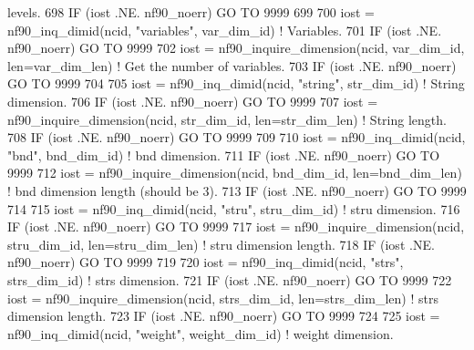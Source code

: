 \begin{DoxyCode}
{       levels.}
698     \textcolor{keywordflow}{IF} (iost .NE. nf90\_noerr) \textcolor{keywordflow}{GO TO} 9999
699 
700     iost    = nf90\_inq\_dimid(ncid, \textcolor{stringliteral}{"variables"}, var\_dim\_id)                     \textcolor{comment}{! Variables.}
701     \textcolor{keywordflow}{IF} (iost .NE. nf90\_noerr) \textcolor{keywordflow}{GO TO} 9999
702     iost    = nf90\_inquire\_dimension(ncid, var\_dim\_id, len=var\_dim\_len)         \textcolor{comment}{! Get the number of
       variables.}
703     \textcolor{keywordflow}{IF} (iost .NE. nf90\_noerr) \textcolor{keywordflow}{GO TO} 9999
704 
705     iost    = nf90\_inq\_dimid(ncid, \textcolor{stringliteral}{"string"}, str\_dim\_id)                        \textcolor{comment}{! String dimension.}
706     \textcolor{keywordflow}{IF} (iost .NE. nf90\_noerr) \textcolor{keywordflow}{GO TO} 9999
707     iost    = nf90\_inquire\_dimension(ncid, str\_dim\_id, len=str\_dim\_len)         \textcolor{comment}{! String length.}
708     \textcolor{keywordflow}{IF} (iost .NE. nf90\_noerr) \textcolor{keywordflow}{GO TO} 9999
709 
710     iost    = nf90\_inq\_dimid(ncid, \textcolor{stringliteral}{"bnd"}, bnd\_dim\_id)                           \textcolor{comment}{! bnd dimension.}
711     \textcolor{keywordflow}{IF} (iost .NE. nf90\_noerr) \textcolor{keywordflow}{GO TO} 9999
712     iost    = nf90\_inquire\_dimension(ncid, bnd\_dim\_id, len=bnd\_dim\_len)         \textcolor{comment}{! bnd dimension length
       (should be 3).}
713     \textcolor{keywordflow}{IF} (iost .NE. nf90\_noerr) \textcolor{keywordflow}{GO TO} 9999
714 
715     iost    = nf90\_inq\_dimid(ncid, \textcolor{stringliteral}{"stru"}, stru\_dim\_id)                         \textcolor{comment}{! stru dimension.}
716     \textcolor{keywordflow}{IF} (iost .NE. nf90\_noerr) \textcolor{keywordflow}{GO TO} 9999
717     iost    = nf90\_inquire\_dimension(ncid, stru\_dim\_id, len=stru\_dim\_len)       \textcolor{comment}{! stru dimension length.}
718     \textcolor{keywordflow}{IF} (iost .NE. nf90\_noerr) \textcolor{keywordflow}{GO TO} 9999
719 
720     iost    = nf90\_inq\_dimid(ncid, \textcolor{stringliteral}{"strs"}, strs\_dim\_id)                         \textcolor{comment}{! strs dimension.}
721     \textcolor{keywordflow}{IF} (iost .NE. nf90\_noerr) \textcolor{keywordflow}{GO TO} 9999
722     iost    = nf90\_inquire\_dimension(ncid, strs\_dim\_id, len=strs\_dim\_len)       \textcolor{comment}{! strs dimension length.}
723     \textcolor{keywordflow}{IF} (iost .NE. nf90\_noerr) \textcolor{keywordflow}{GO TO} 9999
724 
725     iost    = nf90\_inq\_dimid(ncid, \textcolor{stringliteral}{"weight"}, weight\_dim\_id)                     \textcolor{comment}{! weight dimension.}

\end{DoxyCode}
